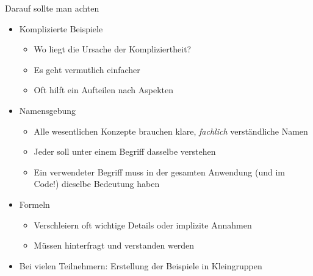 %
%
%	
%	
%	
%
%	
%


\begin{frame}{Darauf sollte man achten}

\begin{itemize}
	\item Komplizierte Beispiele
	\begin{itemize}
		\item Wo liegt die Ursache der Kompliziertheit?
		\item Es geht vermutlich einfacher
		\item Oft hilft ein Aufteilen nach Aspekten
	\end{itemize}
	
	
	\item Namensgebung
	\begin{itemize}
		\item Alle wesentlichen Konzepte brauchen klare, \emph{fachlich} verständliche Namen
		\item Jeder soll unter einem Begriff dasselbe verstehen
		\item Ein verwendeter Begriff muss in der gesamten Anwendung (und im Code!) dieselbe Bedeutung haben
	\end{itemize}
	
	
	\item Formeln
	\begin{itemize}
		\item Verschleiern oft wichtige Details oder implizite Annahmen
		\item Müssen hinterfragt und verstanden werden
	\end{itemize}
	
	
	\item Bei vielen Teilnehmern: Erstellung der Beispiele in Kleingruppen
\end{itemize}

\end{frame}



